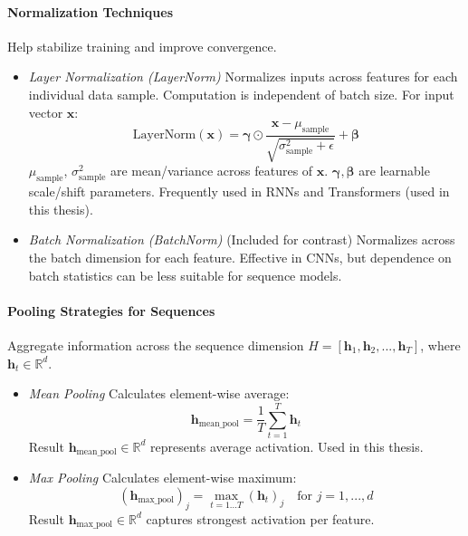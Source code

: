 \begin{appendices}
  \paragraph{Normalization Techniques}
  Help stabilize training and improve convergence.
  \begin{itemize}
    \item \textit{Layer Normalization (LayerNorm)} Normalizes inputs across features for each individual data sample. Computation is independent of batch size. For input vector $ \bm{x} $:
          \begin{equation}
            \text{LayerNorm}(\bm{x}) = \bm{\gamma} \odot \frac{\bm{x} - \mu_{\text{sample}}}{\sqrt{\sigma^2_{\text{sample}} + \epsilon}} + \bm{\beta}
            \label{eq:layernorm}
          \end{equation}
          $ \mu_{\text{sample}} $, $ \sigma^2_{\text{sample}} $ are mean/variance across features of $ \bm{x} $. $ \bm{\gamma}, \bm{\beta} $ are learnable scale/shift parameters. Frequently used in RNNs and Transformers (used in this thesis).
    \item \textit{Batch Normalization (BatchNorm)} (Included for contrast) Normalizes across the batch dimension for each feature. Effective in CNNs, but dependence on batch statistics can be less suitable for sequence models.
  \end{itemize}

  \paragraph{Pooling Strategies for Sequences}
  Aggregate information across the sequence dimension $ H = [\bm{h}_1, \bm{h}_2, ..., \bm{h}_T] $, where $ \bm{h}_t \in \mathbb{R}^d $.
  \begin{itemize}
    \item \textit{Mean Pooling} Calculates element-wise average:
          \begin{equation}
            \bm{h}_{\text{mean\_pool}} = \frac{1}{T} \sum_{t=1}^T \bm{h}_t
          \end{equation}
          Result $ \bm{h}_{\text{mean\_pool}} \in \mathbb{R}^d $ represents average activation. Used in this thesis.
    \item \textit{Max Pooling} Calculates element-wise maximum:
          \begin{equation}
            (\bm{h}_{\text{max\_pool}})_j = \max_{t=1...T} (\bm{h}_t)_j \quad \text{for } j = 1, ..., d
          \end{equation}
          Result $ \bm{h}_{\text{max\_pool}} \in \mathbb{R}^d $ captures strongest activation per feature.
  \end{itemize}


\end{appendices}
